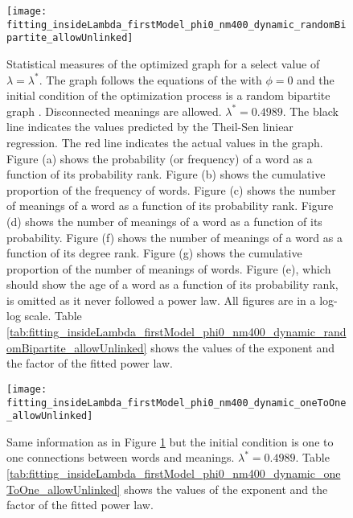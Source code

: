 \begin{figure}
  \centering
  \texttt{[image: fitting\_insideLambda\_firstModel\_phi0\_nm400\_dynamic\_randomBipartite\_allowUnlinked]}
  \caption{
    Statistical measures of the optimized graph for a select value of $\lambda=\lambda^*$.
    The graph follows the equations of the \firstmodel{} with $\phi=0$ and the initial condition of the optimization process is a random bipartite graph . Disconnected meanings are allowed.
    $\lambda^*=0.4989$.
    The black line indicates the values predicted by the Theil-Sen liniear regression.
    The red line indicates the actual values in the graph.
    Figure (a) shows the probability (or frequency) of a word as a function of its probability rank.
    Figure (b) shows the cumulative proportion of the frequency of words.
    Figure (c) shows the number of meanings of a word as a function of its probability rank.
    Figure (d) shows the number of meanings of a word as a function of its probability.
    Figure (f) shows the number of meanings of a word as a function of its degree rank.
    Figure (g) shows the cumulative proportion of the number of meanings of words.
    Figure (e), which should show the age of a word as a function of its probability rank, is omitted as it never followed a power law.
    All figures are in a log-log scale.
    Table \ref{tab:fitting_insideLambda_firstModel_phi0_nm400_dynamic_randomBipartite_allowUnlinked} shows the values of the exponent and the factor of the fitted power law.
  }
  \label{fig:fitting_insideLambda_firstModel_phi0_nm400_dynamic_randomBipartite_allowUnlinked}
\end{figure}

\begin{figure}
  \centering
  \texttt{[image: fitting\_insideLambda\_firstModel\_phi0\_nm400\_dynamic\_oneToOne\_allowUnlinked]}
  \caption{Same information as in Figure \ref{fig:fitting_insideLambda_firstModel_phi0_nm400_dynamic_randomBipartite_allowUnlinked} but the initial condition is one to one connections between words and meanings. $\lambda^*=0.
4989$.
Table \ref{tab:fitting_insideLambda_firstModel_phi0_nm400_dynamic_oneToOne_allowUnlinked} shows the values of the exponent and the factor of the fitted power law.}
  \label{fig:fitting_insideLambda_firstModel_phi0_nm400_dynamic_oneToOne_allowUnlinked}
\end{figure}



